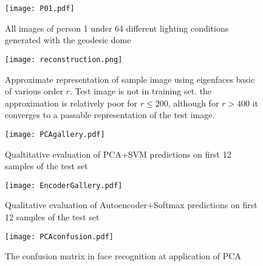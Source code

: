 \begin{figure}[h]
  \centering
  \texttt{[image: P01.pdf]}
  \caption{All images of person 1 under 64 different lighting conditions generated with the geodesic dome}
  \label{P01}
\end{figure}

\begin{figure}[htbp]
  \centering
  \texttt{[image: reconstruction.png]}
  \caption{Approximate representation of sample image using eigenfaces basic of various order $r$. Test image is not in training set. the approximation is relatively poor for $r\leq200$, although for $r>400$ it converges to a passable representation of the test image.}
  \label{appendix:reconstruction}
\end{figure}

\begin{figure}[htbp]
  \centering
  \texttt{[image: PCAgallery.pdf]}
  \caption{Qualtitative evaluation of PCA+SVM predictions on first 12 samples of the test set}
  \label{appendix:PCAgallery}
\end{figure}

\begin{figure}[htbp]
  \centering
  \texttt{[image: EncoderGallery.pdf]}
  \caption{Qualitative evaluation of Autoencoder+Softmax predictions on first 12 samples of the test set}
  \label{appendix:Encodergallery}
\end{figure}

\begin{figure}[p]
  \centering
  \texttt{[image: PCAconfusion.pdf]}
  \caption{The confusion matrix in face recognition at application of PCA}
  \label{appendix:PCAconfusion}
\end{figure}
